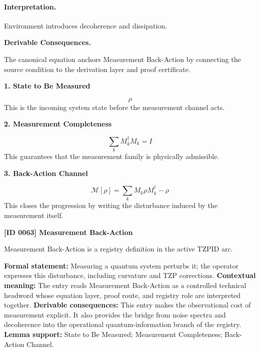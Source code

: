 \paragraph{Interpretation.}
Environment introduces decoherence and dissipation.

\par\vspace{0.35em}
\noindent\textbf{Derivable Consequences.}\quad
\begingroup
\footnotesize
\raggedright
The canonical equation anchors Measurement Back-Action by connecting the source condition to the derivation layer and proof certificate.
\par\endgroup

\noindent\textbf{1. State to Be Measured}\par
\[
\rho
\]
\noindent This is the incoming system state before the measurement channel acts.\par
\noindent\textbf{2. Measurement Completeness}\par
\[
\sum_{k} M_{k}^{\dagger}M_{k} = I
\]
\noindent This guarantees that the measurement family is physically admissible.\par
\noindent\textbf{3. Back-Action Channel}\par
\[
\mathcal{M}[\rho]
=
\sum_{k} M_{k}\rho M_{k}^{\dagger} - \rho
\]
\noindent This closes the progression by writing the disturbance induced by the measurement itself.\par

\clearpage
\noindent\textbf{[ID 0063] Measurement Back-Action}\par
\vspace{0.35em}
\begingroup\small
{}
Measurement Back-Action is a registry definition in the active TZPID arc.

\begingroup\footnotesize\setlength{\emergencystretch}{3em}\sloppy
\textbf{Formal statement:} Measuring a quantum system perturbs it; the operator expresses this disturbance, including curvature and TZP corrections. \textbf{Contextual meaning:} The entry reads Measurement Back-Action as a controlled technical headword whose equation layer, proof route, and registry role are interpreted together. \textbf{Derivable consequences:} This entry makes the observational cost of measurement explicit. It also provides the bridge from noise spectra and decoherence into the operational quantum-information branch of the registry. \textbf{Lemma support:} State to Be Measured; Measurement Completeness; Back-Action Channel.\par
\endgroup

